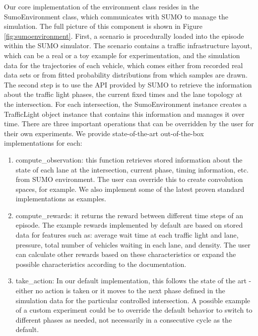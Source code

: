 \documentclass[a4paper,twoside]{article}
\begin{document}
Our core implementation of the environment class resides in the SumoEnvironment class, which communicates with SUMO \cite{SUMMO} to manage the simulation. The full picture of this component is shown in Figure \ref{fig:sumoenvironment}. First, a scenario is procedurally loaded into the episode within the SUMO simulator. The scenario contains a traffic infrastructure layout, which can be a real or a toy example for experimentation, and the simulation data for the trajectories of each vehicle, which comes either from recorded real data sets or from fitted probability distributions from which samples are drawn. The second step is to use the API provided by SUMO to retrieve the information about the traffic light phases, the current fixed times and the lane topology at the intersection. For each intersection, the SumoEnvironment instance creates a TrafficLight object instance that contains this information and manages it over time. There are three important operations that can be overridden by the user for their own experiments. We provide state-of-the-art out-of-the-box implementations for each:
\begin{enumerate}
	\item compute\_observation: this function retrieves stored information about the state of each lane at the intersection, current phase, timing information, etc. from SUMO environment. The user can override this to create convolution spaces, for example. We also implement some of the latest proven standard implementations as examples.
	\item compute\_rewards: it returns the reward between different time steps of an episode. The example rewards implemented by default are based on stored data for features such as: average wait time at each traffic light and lane, pressure, total number of vehicles waiting in each lane, and density. The user can calculate other rewards based on these characteristics or expand the possible characteristics according to the documentation.
	\item take\_action: In our default implementation, this follows the state of the art - either no action is taken or it moves to the next phase defined in the simulation data for the particular controlled intersection. A possible example of a custom experiment could be to override the default behavior to switch to different phases as needed, not necessarily in a consecutive cycle as the default.
\end{enumerate}
\end{document}
